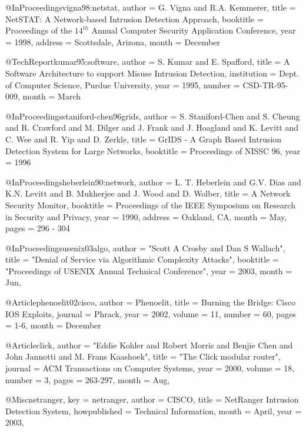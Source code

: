 @InProceedings{vigna98:netstat,
  author =       {G. Vigna and R.A. Kemmerer},
  title =        {{NetSTAT: A Network-based Intrusion Detection Approach}},
  booktitle =    {Proceedings of the $14^{th}$ Annual Computer
    Security Application Conference},
  year =         1998,
  address =      {Scottsdale, Arizona},
  month =        {December}
}

@TechReport{kumar95:software,
  author =       {S. Kumar and E. Spafford},
  title =        {{A Software Architecture to support Misuse Intrusion Detection}},
  institution =  {Dept. of Computer Science, Purdue University},
  year =         1995,
  number =       {CSD-TR-95-009},
  month =        {March}
}

@InProceedings{staniford-chen96grids,
  author =       {S. Staniford-Chen and S. Cheung and R. Crawford and M. Dilger and J. Frank and J. Hoagland and K. Levitt and C. Wee and R. Yip and D. Zerkle},
  title =        {{GrIDS - A Graph Based Intrusion Detection System for Large Networks}},
  booktitle =    {Proceedings of NISSC 96},
  year =         1996
}

@InProceedings{heberlein90:network,
  author =       {L. T. Heberlein and G.V. Dias and K.N. Levitt and B. Mukherjee and J. Wood and D. Wolber},
  title =        {{A Network Security Monitor}},
  booktitle =    {Proceedings of the IEEE Symposium on Research in Security and Privacy},
  year =         1990,
  address =      {Oakland, CA},
  month =        {May},
  pages =        {296 - 304}
}

@InProceedings{usenix03algo,
  author =       "Scott A Crosby and Dan S Wallach",
  title =        "Denial of Service via Algorithmic Complexity Attacks",
  booktitle =    "Proceedings of USENIX Annual Technical Conference",
  year =         2003,
  month =        Jun,
}


@Article{phenoelit02cisco,
        author = {Phenoelit},
        title = {{Burning the Bridge: Cisco {IOS} Exploits}},
        journal = {Phrack},
        year = 2002,
        volume = 11,
        number = 60,
        pages = {1-6},
        month = {December}
}

@Article{click,
        author = "Eddie Kohler and Robert Morris and Benjie Chen and John Jannotti and M. Frans Kaashoek",
        title = "The Click modular router",
        journal = {ACM Transactions on Computer Systems},
        year = 2000,
        volume = 18,
        number = 3,
        pages = {263-297},
        month = Aug,
}

@Misc{netranger,
  key =          {netranger},
  author =       {CISCO},
  title =        {{NetRanger Intrusion Detection System}},
  howpublished = {Technical Information},
  month =        {April},
  year =         2003,
}

